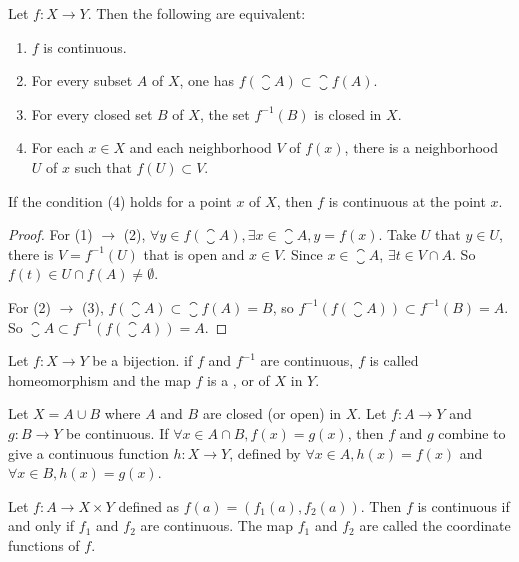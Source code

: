 \begin{theorem}
Let $f: X \rightarrow Y$. Then the following are equivalent:
\begin{enumerate}
    \item $f$ is continuous.
    \item For every subset $A$ of $X$, one has $f(\closure{A}) \subset \closure{f(A)}$.
    \item For every closed set $B$ of $X$, the set $f^{-1}(B)$ is closed in $X$.
    \item For each $x\in X$ and each neighborhood $V$ of $f(x)$, there is a neighborhood $U$ of $x$ such that $f(U) \subset V$.
\end{enumerate}    

If the condition (4) holds for a point $x$ of $X$, then $f$ is continuous at the point $x$.
\end{theorem}
\begin{proof}
    For (1) $\rightarrow$ (2), $\forall y \in f(\closure{A}), \exists x \in \closure{A}, y = f(x)$. Take $U$ that $y \in U$, there is $V = f^{-1}(U)$ that is open and $x \in V$. Since $x \in \closure{A}$, $\exists t \in V \cap A$. So $f(t) \in U \cap f(A) \neq \emptyset$.
    
    For (2) $\rightarrow$ (3), $f(\closure{A}) \subset \closure{f(A)} = B$, so $f^{-1} \left(f(\closure{A}) \right) \subset f^{-1}(B) = A$. So $\closure{A} \subset f^{-1} \left(f(\closure{A}) \right) = A$.
\end{proof}


\begin{definition}
    Let $f:X \rightarrow Y$ be a bijection. if $f$ and $f^{-1}$ are continuous, $f$ is called homeomorphism and the map $f$ is a , or  of $X$ in $Y$.
\end{definition}


\begin{theorem}
    Let $X = A \cup B$ where $A$ and $B$ are closed (or open) in $X$. Let $f: A \rightarrow Y$ and $g: B \rightarrow Y$ be continuous. If $\forall x \in A \cap B, f(x) = g(x)$, then $f$ and $g$ combine to give a continuous function $h: X \rightarrow Y$, defined by $\forall x \in A, h(x) = f(x) $ and $\forall x \in B , h(x) = g(x)$.
\end{theorem}

\begin{theorem}
Let $f: A \rightarrow X \times Y$ defined as $f(a) = \left(f_1(a), f_2(a) \right)$. Then $f$ is continuous if and only if $f_1$ and $f_2$ are continuous. The map $f_1$ and $f_2$ are called the coordinate functions of $f$.
\end{theorem}


